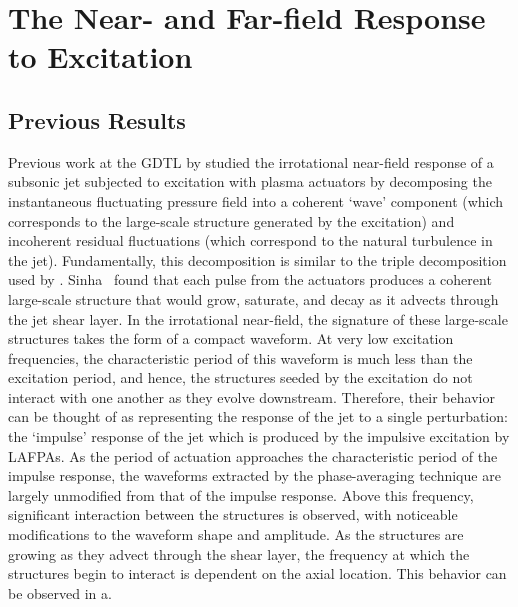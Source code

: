 \section{The Near- and Far-field Response to Excitation}
\label{sect:nearfield}
\subsection{Previous Results}
Previous work at the GDTL by \citet{Sinha2012} studied the irrotational near-field response of a subsonic jet subjected to excitation with plasma actuators by decomposing the instantaneous fluctuating pressure field into a coherent `wave' component (which corresponds to the large-scale structure generated by the excitation) and incoherent residual fluctuations (which correspond to the natural turbulence in the jet). 
Fundamentally, this decomposition is similar to the triple decomposition used by \citet{Hussain1970}.
Sinha \etal~found that each pulse from the actuators produces a coherent large-scale structure that would grow, saturate, and decay as it advects through the jet shear layer. 
In the irrotational near-field, the signature of these large-scale structures takes the form of a compact waveform. 
At very low excitation frequencies, the characteristic period of this waveform is much less than the excitation period, and hence, the structures seeded by the excitation do not interact with one another as they evolve downstream. 
Therefore, their behavior can be thought of as representing the response of the jet to a single perturbation: the `impulse' response of the jet which is produced by the impulsive excitation by LAFPAs.
As the period of actuation approaches the characteristic period of the impulse response, the waveforms extracted by the phase-averaging technique are largely unmodified from that of the impulse response. 
Above this frequency, significant interaction between the structures is observed, with noticeable modifications to the waveform shape and amplitude. 
As the structures are growing as they advect through the shear layer, the frequency at which the structures begin to interact is dependent on the axial location.
This behavior can be observed in a.
